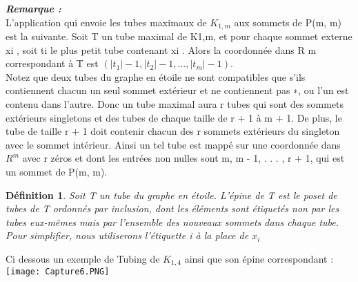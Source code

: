 \documentclass{book}
\newtheorem{petit_nom2}{Définition}[chapter]
\begin{document}
\textbf{\textit{Remarque : }}\\
L'application qui envoie les tubes maximaux de $K_{1,m}$ aux sommets de P(m, m) est la suivante. Soit T un tube maximal de K1,m, et pour chaque sommet externe xi , soit ti le plus petit tube contenant xi . Alors la coordonnée dans R
m correspondant à T est $(|t_1| − 1, |t_2| − 1, . . . , |t_m| − 1)$.\\
Notez que deux tubes du graphe en étoile ne sont compatibles que s'ils contiennent chacun un seul sommet extérieur
et ne contiennent pas ∗, ou l'un est contenu dans l'autre. Donc un tube maximal aura r tubes
qui sont des sommets extérieurs singletons et des tubes de chaque taille de r + 1 à m + 1. De plus, le tube
de taille r + 1 doit contenir chacun des r sommets extérieurs du singleton avec le sommet intérieur. Ainsi
un tel tube est mappé sur une coordonnée dans $R^m$ avec r zéros et dont les entrées non nulles sont
{m, m - 1, . . . , r + 1}, qui est un sommet de P(m, m).\\

\begin{petit_nom2}
  Soit T un tube du graphe en étoile. L'épine de T est le poset de tubes de T ordonnés par inclusion, dont les éléments sont étiquetés non par les tubes eux-mêmes mais par l'ensemble des nouveaux
sommets dans chaque tube. Pour simplifier, nous utiliserons l'étiquette i à la place de $x_i$
\end{petit_nom2}
Ci dessous un exemple de Tubing de $K_{1,4}$ ainsi que son épine correspondant :\\
\texttt{[image: Capture6.PNG]}\\
\end{document}
